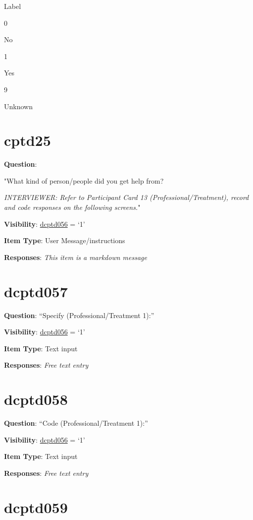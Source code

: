 \documentclass[]{book}
\begin{document}
Label

0

No

1

Yes

9

Unknown

\hypertarget{cptd25}{%
\section{cptd25}\label{cptd25}}

\textbf{Question}:

"What kind of person/people did you get help from?

\emph{INTERVIEWER: Refer to Participant Card 13 (Professional/Treatment), record and code responses on the following screens.}"

\textbf{Visibility}: \protect\hyperlink{dcptd056}{dcptd056} = `1'

\textbf{Item Type}: User Message/instructions

\textbf{Responses}: \emph{This item is a markdown message}

\hypertarget{dcptd057}{%
\section{dcptd057}\label{dcptd057}}

\textbf{Question}: ``Specify (Professional/Treatment 1):''

\textbf{Visibility}: \protect\hyperlink{dcptd056}{dcptd056} = `1'

\textbf{Item Type}: Text input

\textbf{Responses}: \emph{Free text entry}

\hypertarget{dcptd058}{%
\section{dcptd058}\label{dcptd058}}

\textbf{Question}: ``Code (Professional/Treatment 1):''

\textbf{Visibility}: \protect\hyperlink{dcptd056}{dcptd056} = `1'

\textbf{Item Type}: Text input

\textbf{Responses}: \emph{Free text entry}

\hypertarget{dcptd059}{%
\section{dcptd059}\label{dcptd059}}
\end{document}
